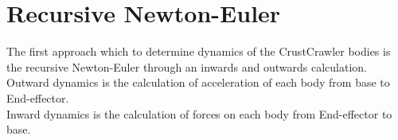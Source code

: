 \section{Recursive Newton-Euler}
The first approach which to determine dynamics of the CrustCrawler bodies is the recursive Newton-Euler through an inwards and outwards calculation. \\
Outward dynamics is the calculation of acceleration of each body from base to End-effector.\\
Inward dynamics is the calculation of forces on each body from End-effector to base.\\

